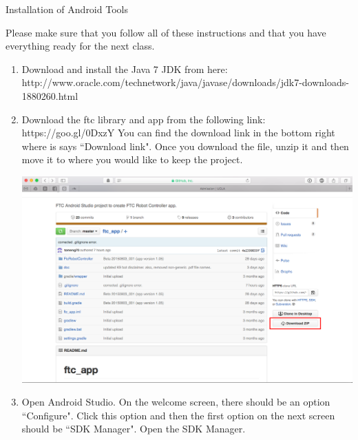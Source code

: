 \documentclass[11pt,fleqn]{article}
\theoremstyle{definition}
\begin{document}
\begin{center}
{\Huge
Installation of Android Tools
}\\
\end{center}

Please make sure that you follow all of these instructions and that you have
everything ready for the next class.

\begin{enumerate}[1.]
\item
Download and install the Java 7 JDK from here:\newline
http://www.oracle.com/technetwork/java/javase/downloads/jdk7-downloads-1880260.html

\item
Download the ftc library and app from the following link:\newline
https://goo.gl/0DxzY\newline
You can find the download link in the bottom right where is says ``Download
link". Once you download the file, unzip it and then move it to where you would
like to keep the project. 

\begin{center}
\includegraphics[scale=.3]{Step1}
\end{center}

\item
Open Android Studio. On the welcome screen, there should be an option
``Configure". Click this option and then the first option on the next screen
should be ``SDK Manager". Open the SDK Manager. 


\end{enumerate}
\end{document}
